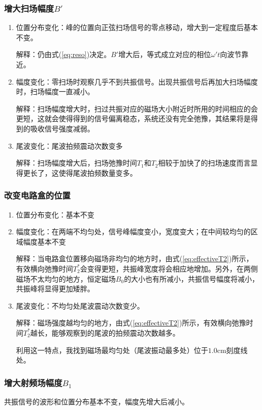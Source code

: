 \documentclass[aps,pre,12pt,preprint,onecolumn,showpacs,showkeys]{revtex4-1}
\begin{document}
\subsubsection{增大扫场幅度$B'$}
\begin{enumerate}
\item 位置分布变化：峰的位置向正弦扫场信号的零点移动，增大到一定程度后基本不变。

解释：仍由式(\ref{eq:reso})决定。$B'$增大后，等式成立对应的相位$\omega' t $向波节靠近。

\item 幅度变化：零扫场时观察几乎不到共振信号。出现共振信号后再加大扫场幅度时，扫场幅度一直减小。

解释：扫场幅度增大时，扫过共振对应的磁场大小附近时所用的时间相应的会更短，这就会使得得到的信号偏离稳态，系统还没有完全弛豫，其结果将是得到的吸收信号强度减弱。

\item 尾波变化：尾波拍频震动次数变多

解释：扫场幅度增大后，扫场弛豫时间$T_1$和$T_2$相较于加快了的扫场速度而言显得更长了，这使得尾波拍频数量变多。
\end{enumerate}
\subsubsection{改变电路盒的位置}
\begin{enumerate}
\item 位置分布变化：基本不变
\item 幅度变化：在两端不均匀处，信号峰幅度变小，宽度变大；在中间较均匀的区域幅度基本不变

解释：当电路盒位置移向磁场非均匀的地方时，由式(\ref{eq:effectiveT2})所示，有效横向弛豫时间$T_2^*$会变得更短，共振峰宽度将会相应地增加。另外，在两侧磁场不太均匀的地方，恒定磁场$B_0$的大小也有所减小，共振信号幅度将减小，共振峰将显得更加矮胖。

\item 尾波变化：不均匀处尾波震动次数变少。

解释：磁场强度越均匀的地方，由式(\ref{eq:effectiveT2})所示，有效横向弛豫时间$T_2^*$越长，能够观察到的尾波的拍频震动次数越多。

利用这一特点，我找到磁场最均匀处（尾波振动最多处）位于$1.0 \mathrm{cm}$刻度线处。
\end{enumerate}

\subsubsection{增大射频场幅度$B_1$}
共振信号的波形和位置分布基本不变，幅度先增大后减小。
\end{document}
